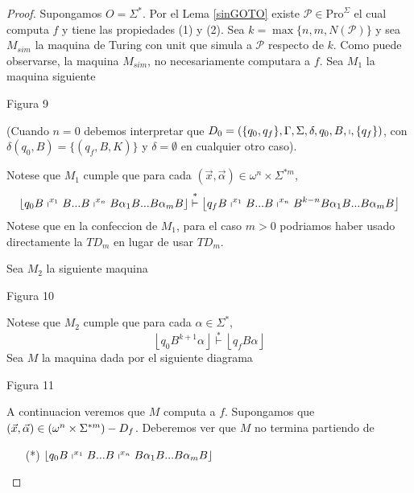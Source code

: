 \begin{frame}
  \begin{proof}
  Supongamos $O=\Sigma ^{\ast }$. Por el Lema \ref{sinGOTO} existe $\mathcal{P}%
  \in \mathrm{Pro}^{\Sigma }$ el cual computa $f$ y tiene las propiedades (1)
  y (2). Sea $k=\max \{n,m,N(\mathcal{P})\}$ y sea $M_{sim}$ la maquina de
  Turing con unit que simula a $\mathcal{P}$ respecto de $k$. Como puede
  observarse, la maquina $M_{sim}$, no necesariamente computara a $f$. Sea $%
  M_{1}$ la maquina siguiente

  Figura 9

  (Cuando $n=0$ debemos interpretar que $D_{0}=\left( \{q_{0},q_{f}\},\Gamma
  ,\Sigma ,\delta ,q_{0},B,\shortmid ,\{q_{f}\}\right) $, con $\delta
  (q_{0},B)=\{(q_{f},B,K)\}$ y $\delta =\emptyset $ en cualquier otro caso).

  Notese que $M_{1}$ cumple que para cada $(\vec{x},\vec{\alpha})\in \omega
  ^{n}\times \Sigma ^{\ast m}$,%
  \begin{equation*}
  \left\lfloor q_{0}B\shortmid ^{x_{1}}B...B\shortmid ^{x_{n}}B\alpha
  _{1}B...B\alpha _{m}B\right\rfloor \overset{\ast }{\vdash }\left\lfloor
  q_{f}B\shortmid ^{x_{1}}B...B\shortmid ^{x_{n}}B^{k-n}B\alpha
  _{1}B...B\alpha _{m}B\right\rfloor
  \end{equation*}%
  Notese que en la confeccion de $M_{1}$, para el caso $m>0$ podriamos haber
  usado directamente la $TD_{m}$ en lugar de usar $TD_{m}$.

  Sea $M_{2}$ la siguiente maquina

  Figura 10

  Notese que $M_{2}$ cumple que para cada $\alpha \in \Sigma ^{\ast }$,%
  \begin{equation*}
  \left\lfloor q_{0}B^{k+1}\alpha \right\rfloor \overset{\ast }{\vdash }%
  \left\lfloor q_{f}B\alpha \right\rfloor
  \end{equation*}%
  Sea $M$ la maquina dada por el siguiente diagrama

  Figura 11

  A continuacion veremos que $M$ computa a $f$. Supongamos que $(\vec{x},\vec{%
  \alpha})\in (\omega ^{n}\times \Sigma ^{\ast m})-D_{f}$. Deberemos ver que $M
  $ no termina partiendo de

  \begin{enumerate}
  \item[(*)] $\left\lfloor q_{0}B\shortmid ^{x_{1}}B...B\shortmid
  ^{x_{n}}B\alpha _{1}B...B\alpha _{m}B\right\rfloor $
  \end{enumerate}


\end{proof}
\end{frame}
